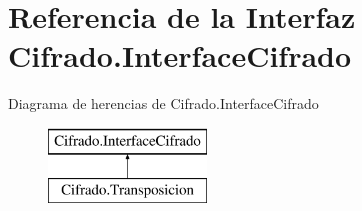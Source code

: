 \hypertarget{interface_cifrado_1_1_interface_cifrado}{}\section{Referencia de la Interfaz Cifrado.\+Interface\+Cifrado}
\label{interface_cifrado_1_1_interface_cifrado}
Diagrama de herencias de Cifrado.\+Interface\+Cifrado\begin{figure}[H]
\begin{center}
\leavevmode
\includegraphics[height=2.000000cm]{interface_cifrado_1_1_interface_cifrado}
\end{center}
\end{figure}
